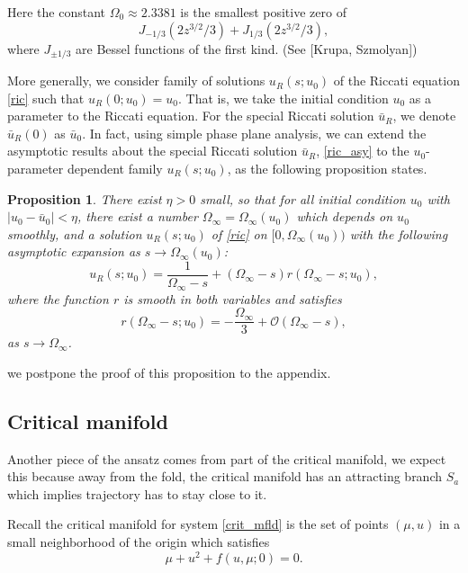 \documentclass[letterpaper,11pt]{article}
\newcommand{\rmO}{\mathcal{O}}
\numberwithin{equation}{section}
\theoremstyle{plain}
\newtheorem{proposition}[theorem]{Proposition}
\begin{document}
Here the constant $\Omega_0 \approx 2.3381$ is the smallest positive zero of 
\[
J_{-1/3}(2z^{3/2}/3)+J_{1/3}(2z^{3/2}/3),
\]
where $J_{\pm 1/3}$ are Bessel functions of the first kind. (See [Krupa, Szmolyan])


More generally, we consider family of solutions  $u_R(s; u_0)$ of the Riccati equation  \eqref{ric} such that $u_R(0; u_0) = u_0$. That is, we take the initial condition $u_0$ as a parameter to the Riccati equation. For the special Riccati solution $\bar{u}_R$, we denote $\bar{u}_R(0) $ as $\bar{u}_0$. In fact, using simple phase plane analysis, we can extend the asymptotic results about the special Riccati solution $\bar{u}_R$, \eqref{ric_asy} to the $u_0$-parameter dependent family $u_R(s; u_0)$, as the following proposition states.

\begin{proposition}\label{para_ric}
There exist $\eta>0$ small, so that for all initial condition $u_0$ with $|u_0- \bar{u}_0|<\eta$, there exist a number $\Omega_\infty=\Omega_\infty(u_0)$ which depends on $u_0$ smoothly, and a solution $u_R(s;u_0)$ of \eqref{ric} on $[0, \Omega_\infty(u_0))$ with the following asymptotic expansion as $s\to \Omega_\infty(u_0)$:
\begin{equation}\label{ric_exp}
u_R(s;u_0) = \frac{1}{\Omega_\infty-s} +  (\Omega_\infty-s) r(\Omega_\infty-s;u_0),
\end{equation}
where the function $r$ is smooth in both variables and satisfies
\begin{equation}\label{ric_reminder}
r( \Omega_\infty-s; u_0) = -\frac{\Omega_\infty}{3} + \rmO(\Omega_\infty-s),
\end{equation}
as $s \to \Omega_\infty$.
\end{proposition}
we postpone the proof of this proposition to the appendix.
\subsection{Critical manifold}\label{c_mfld}
Another piece of the ansatz comes from part of  the critical manifold, we expect this because away from the fold, the critical manifold has an attracting branch $S_a$ which implies trajectory has to stay close to it. 

Recall the critical manifold for system \eqref{crit_mfld} is the set of points $(\mu, u) $ in a small neighborhood of the origin which satisfies
\begin{equation} \label{crit_mfld}
\mu + u^2 + f(u,\mu; 0) =  0.
\end{equation}
\end{document}
